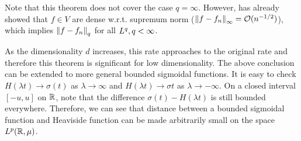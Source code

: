
Note that this theorem does not cover the case $q = \infty$. However,
\cite{barronUniversalApproximationBounds1993} has already showed that $f\in V$ are
dense w.r.t. supremum norm ($\left\| f - f_n \right\|_{\infty} = \mathcal{O}(n^{-1/2})$), which
implies $\left\| f-f_n \right\|_{q}$ for all $L^{q}, q<\infty$.

As the dimensionality $d$ increases, this rate approaches to the original rate
and therefore this theorem is significant for low dimensionality. The above
conclusion can be extended to more general bounded sigmoidal functions. It is
easy to check $H(\lambda t) \to \sigma(t)$ as $\lambda \to \infty$ and
$H(\lambda t) \to \sigma{t}$ as $\lambda \to -\infty$. On a closed interval
$[-u, u]$ on $\mathbb{R}$, note that the difference $\sigma(t) - H(\lambda t)$ is still
bounded everywhere. Therefore, we can see that distance between a bounded
sigmoidal function and Heaviside function can be made arbitrarily small on the
space $L^{p}(\mathbb{R}, \mu)$.

